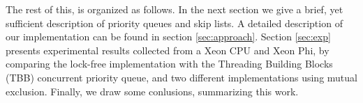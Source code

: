 The rest of this, is organized as follows.
In the next section we give a brief, yet sufficient description of priority queues and skip lists. 
A detailed description of our implementation can be found in section \ref{sec:approach}.
Section \ref{sec:exp} presents experimental results collected from a Xeon CPU and Xeon Phi, by comparing the lock-free implementation with the Threading Building Blocks (TBB) concurrent priority queue, and two different implementations using mutual exclusion.
Finally, we draw some conlusions, summarizing this work.

